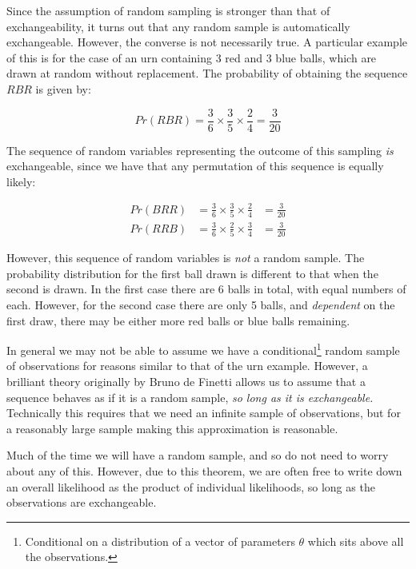 \documentclass[11pt,fullpage]{book}
\begin{document}
Since the assumption of random sampling is stronger than that of exchangeability, it turns out that any random sample is automatically exchangeable. However, the converse is not necessarily true. A particular example of this is for the case of an urn containing 3 red and 3 blue balls, which are drawn at random without replacement. The probability of obtaining the sequence $RBR$ is given by:

\begin{equation}
Pr(RBR) = \frac{3}{6} \times \frac{3}{5} \times \frac{2}{4} = \frac{3}{20}
\end{equation}

The sequence of random variables representing the outcome of this sampling \textit{is} exchangeable, since we have that any permutation of this sequence is equally likely:

\begin{equation}
\begin{align}
Pr(BRR) &= \frac{3}{6} \times \frac{3}{5} \times \frac{2}{4} &= \frac{3}{20}\\
Pr(RRB) &= \frac{3}{6} \times \frac{2}{5} \times \frac{3}{4} &= \frac{3}{20}
\end{align}
\end{equation}

However, this sequence of random variables is \textit{not} a random sample. The probability distribution for the first ball drawn is different to that when the second is drawn. In the first case there are 6 balls in total, with equal numbers of each. However, for the second case there are only 5 balls, and \textit{dependent} on the first draw, there may be either more red balls or blue balls remaining.

In general we may not be able to assume we have a conditional\footnote{Conditional on a distribution of a vector of parameters $\theta$ which sits above all the observations.} random sample of observations for reasons similar to that of the urn example. However, a brilliant theory originally by Bruno de Finetti allows us to assume that a sequence behaves as if it is a random sample, \textit{so long as it is exchangeable.} Technically this requires that we need an infinite sample of observations, but for a reasonably large sample making this approximation is reasonable.

Much of the time we will have a random sample, and so do not need to worry about any of this. However, due to this theorem, we are often free to write down an overall likelihood as the product of individual likelihoods, so long as the observations are exchangeable.
\end{document}
